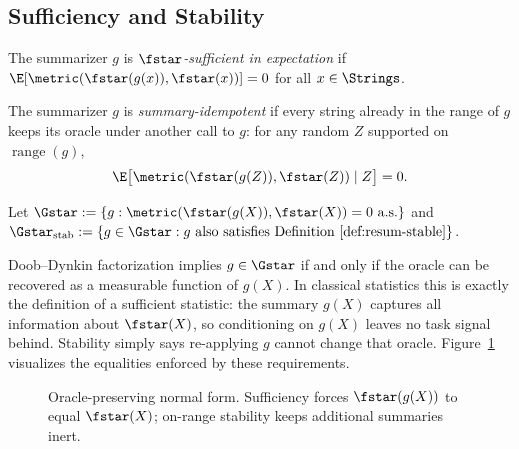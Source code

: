 \subsection{Sufficiency and Stability}

\begin{definition}\label{def:expect-suff}
The summarizer $g$ is \emph{$\fstar$-sufficient in expectation} if $\E[\metric(\fstar(g(x)), \fstar(x))] = 0$ for all $x \in \Strings$.
\end{definition}

\begin{definition}\label{def:resum-stable}
The summarizer $g$ is \emph{summary-idempotent} if every string already in the range of $g$ keeps its oracle under another call to $g$: for any random $Z$ supported on $\operatorname{range}(g)$,
\[
\E\big[\metric(\fstar(g(Z)), \fstar(Z)) \mid Z\big] = 0.
\]
\end{definition}

\begin{definition}\label{def:exact-suff-stable}
Let $\Gstar := \{g : \metric(\fstar(g(X)), \fstar(X)) = 0\ \text{a.s.}\}$ and $\Gstar_{\mathrm{stab}} := \{g \in \Gstar : \text{$g$ also satisfies Definition~\ref{def:resum-stable}}\}$.
\end{definition}

Doob--Dynkin factorization implies $g \in \Gstar$ if and only if the oracle can be recovered as a measurable function of $g(X)$. In classical statistics this is exactly the definition of a sufficient statistic: the summary $g(X)$ captures all information about $\fstar(X)$, so conditioning on $g(X)$ leaves no task signal behind. Stability simply says re-applying $g$ cannot change that oracle. Figure~\ref{fig:gstar} visualizes the equalities enforced by these requirements.

\begin{figure}[t]
    \centering
    \caption{Oracle-preserving normal form. Sufficiency forces $\fstar(g(X))$ to equal $\fstar(X)$; on-range stability keeps additional summaries inert.}
    \label{fig:gstar}
\end{figure}


